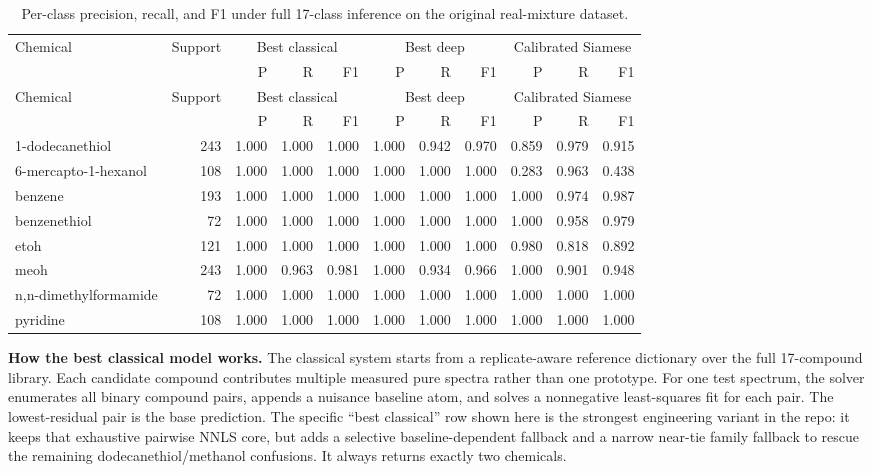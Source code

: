 \documentclass[11pt]{article}
\begin{document}
\begin{landscape}
\begin{center}
\small
\begin{longtable}{lrrrrrrrrrr}
\caption{Per-class precision, recall, and F1 under full 17-class inference on the original real-mixture dataset.}\\
\toprule
Chemical & Support & \multicolumn{3}{c}{Best classical} & \multicolumn{3}{c}{Best deep} & \multicolumn{3}{c}{Calibrated Siamese} \\
\cmidrule(lr){3-5} \cmidrule(lr){6-8} \cmidrule(lr){9-11}
 &  & P & R & F1 & P & R & F1 & P & R & F1 \\
\midrule
\endfirsthead
\toprule
Chemical & Support & \multicolumn{3}{c}{Best classical} & \multicolumn{3}{c}{Best deep} & \multicolumn{3}{c}{Calibrated Siamese} \\
\cmidrule(lr){3-5} \cmidrule(lr){6-8} \cmidrule(lr){9-11}
 &  & P & R & F1 & P & R & F1 & P & R & F1 \\
\midrule
\endhead
        1-dodecanethiol & 243 & 1.000 & 1.000 & 1.000 & 1.000 & 0.942 & 0.970 & 0.859 & 0.979 & 0.915 \\
        6-mercapto-1-hexanol & 108 & 1.000 & 1.000 & 1.000 & 1.000 & 1.000 & 1.000 & 0.283 & 0.963 & 0.438 \\
        benzene & 193 & 1.000 & 1.000 & 1.000 & 1.000 & 1.000 & 1.000 & 1.000 & 0.974 & 0.987 \\
        benzenethiol & 72 & 1.000 & 1.000 & 1.000 & 1.000 & 1.000 & 1.000 & 1.000 & 0.958 & 0.979 \\
        etoh & 121 & 1.000 & 1.000 & 1.000 & 1.000 & 1.000 & 1.000 & 0.980 & 0.818 & 0.892 \\
        meoh & 243 & 1.000 & 0.963 & 0.981 & 1.000 & 0.934 & 0.966 & 1.000 & 0.901 & 0.948 \\
        n,n-dimethylformamide & 72 & 1.000 & 1.000 & 1.000 & 1.000 & 1.000 & 1.000 & 1.000 & 1.000 & 1.000 \\
        pyridine & 108 & 1.000 & 1.000 & 1.000 & 1.000 & 1.000 & 1.000 & 1.000 & 1.000 & 1.000 \\
\bottomrule
\end{longtable}
\end{center}
\end{landscape}

\textbf{How the best classical model works.} The classical system starts from a replicate-aware reference dictionary over the full 17-compound library. Each candidate compound contributes multiple measured pure spectra rather than one prototype. For one test spectrum, the solver enumerates all binary compound pairs, appends a nuisance baseline atom, and solves a nonnegative least-squares fit for each pair. The lowest-residual pair is the base prediction. The specific ``best classical'' row shown here is the strongest engineering variant in the repo: it keeps that exhaustive pairwise NNLS core, but adds a selective baseline-dependent fallback and a narrow near-tie family fallback to rescue the remaining dodecanethiol/methanol confusions. It always returns exactly two chemicals.
\end{document}
